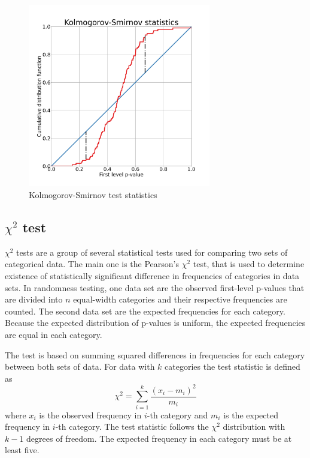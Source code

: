 \documentclass[
  digital,     %
  oneside,     %
  nosansbold,  %
  nocolorbold, %
  nolof,         %
  nolot,         %
]{fithesis4}
\begin{document}
\begin{figure}
  \begin{center}
    \includegraphics[width=8cm]{figures/ks_d.png}
  \end{center}
  \caption{Kolmogorov-Smirnov test statistics}
  \label{fig:ks_d}
\end{figure}


\subsection{$\chi^2$ test}
$\chi^2$ tests are a group of several statistical tests used for comparing two sets of categorical data. The main one is the Pearson's $\chi^2$ test, that is used to determine existence of statistically significant difference in frequencies of categories in data sets. In randomness testing, one data set are the observed first-level p-values that are divided into $n$ equal-width categories and their respective frequencies are counted. The second data set are the expected frequencies for each category. Because the expected distribution of p-values is uniform, the expected frequencies are equal in each category. 
 
The test is based on summing squared differences in frequencies for each category between both sets of data. For data with $k$ categories the test statistic is defined as \[\chi^2 = \sum_{i=1}^{k} \dfrac{(x_i - m_i)^2}{m_i} \]
where $x_i$ is the observed frequency in $i$-th category and $m_i$ is the expected frequency in $i$-th category. The test statistic follows the $\chi^2$ distribution with $k-1$ degrees of freedom. The expected frequency in each category must be at least five. \cite[p. 171]{stat-procedures}
 
\end{document}
